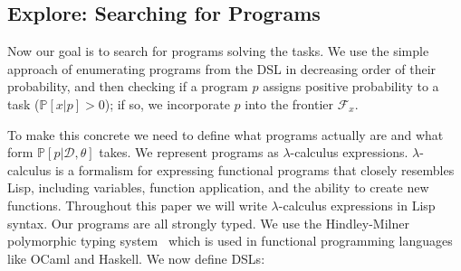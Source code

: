 \documentclass{article}
\newcommand{\code}[1]{{\footnotesize\texttt{#1}}}
\newcommand{\probability}{\mathds{P}} %
\begin{document}






\subsection{Explore: Searching for Programs}\label{explorationSection}

Now our goal is to search for programs solving the tasks.  We use the simple approach of enumerating programs from
the DSL  in decreasing order of their probability,
and then checking if a program $p$ assigns positive
probability to a task ($\probability[x|p] > 0$); if so, we incorporate $p$ 
into the frontier $\mathcal{F}_x$.

To make this concrete we need to define what programs actually are and
what form $\probability[p |\mathcal{D},\theta]$ takes.
We represent programs as $\lambda$-calculus expressions.
$\lambda$-calculus is a formalism for expressing functional programs
that closely resembles Lisp,
including variables, function application, and the ability to create new functions.
Throughout this paper we will write $\lambda$-calculus expressions in Lisp syntax.
Our programs are all strongly typed.
We use the Hindley-Milner polymorphic typing system~\cite{pierce} which is
used in functional programming languages like OCaml and Haskell.
We now define DSLs:
\end{document}
